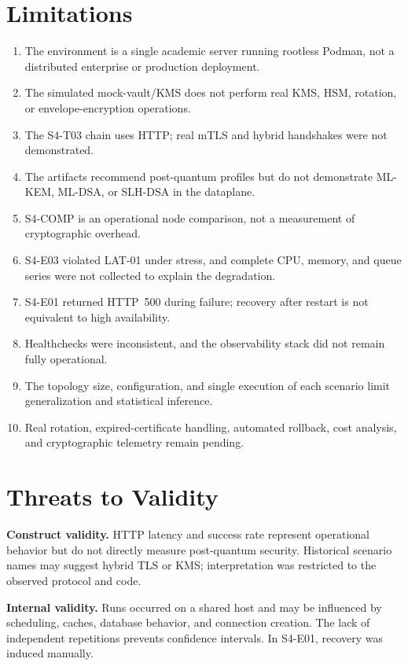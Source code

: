 \documentclass[12pt]{article}
\begin{document}
\section{Limitations}
\begin{enumerate}
\item The environment is a single academic server running rootless Podman, not a distributed enterprise or production deployment.
\item The simulated mock-vault/KMS does not perform real KMS, HSM, rotation, or envelope-encryption operations.
\item The S4-T03 chain uses HTTP; real mTLS and hybrid handshakes were not demonstrated.
\item The artifacts recommend post-quantum profiles but do not demonstrate ML-KEM, ML-DSA, or SLH-DSA in the dataplane.
\item S4-COMP is an operational node comparison, not a measurement of cryptographic overhead.
\item S4-E03 violated LAT-01 under stress, and complete CPU, memory, and queue series were not collected to explain the degradation.
\item S4-E01 returned HTTP~500 during failure; recovery after restart is not equivalent to high availability.
\item Healthchecks were inconsistent, and the observability stack did not remain fully operational.
\item The topology size, configuration, and single execution of each scenario limit generalization and statistical inference.
\item Real rotation, expired-certificate handling, automated rollback, cost analysis, and cryptographic telemetry remain pending.
\end{enumerate}

\section{Threats to Validity}
\textbf{Construct validity.} HTTP latency and success rate represent operational behavior but do not directly measure post-quantum security. Historical scenario names may suggest hybrid TLS or KMS; interpretation was restricted to the observed protocol and code.

\textbf{Internal validity.} Runs occurred on a shared host and may be influenced by scheduling, caches, database behavior, and connection creation. The lack of independent repetitions prevents confidence intervals. In S4-E01, recovery was induced manually.
\end{document}
